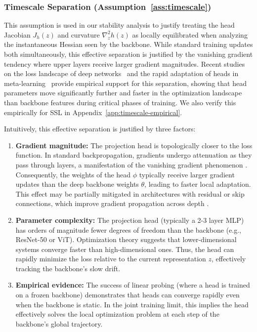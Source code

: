 \documentclass{article}
\theoremstyle{plain}
\theoremstyle{definition}
\theoremstyle{remark}
\begin{document}
\subsubsection{Timescale Separation (Assumption~\ref{ass:timescale})}
\label{app:timescale}

This assumption is used in our stability analysis to justify treating the head Jacobian $J_h(z)$ and curvature $\nabla^2_z h(z)$ as locally equilibrated when analyzing the instantaneous Hessian seen by the backbone. While standard training updates both simultaneously, this effective separation is justified by the vanishing gradient tendency where upper layers receive larger gradient magnitudes. Recent studies on the loss landscape of deep networks~\citep{fort2020deeplearningversuskernel} and the rapid adaptation of heads in meta-learning~\citep{raghu2020rapid} provide empirical support for this separation, showing that head parameters move significantly further and faster in the optimization landscape than backbone features during critical phases of training. We also verify this empirically for SSL in Appendix~\ref{app:timescale-empirical}.

Intuitively, this effective separation is justified by three factors:
\begin{enumerate}
    \item \textbf{Gradient magnitude:} The projection head is topologically closer to the loss function. In standard backpropagation, gradients undergo attenuation as they pass through layers, a manifestation of the vanishing gradient phenomenon \citep{bengio1994}. Consequently, the weights of the head $\phi$ typically receive larger gradient updates than the deep backbone weights $\theta$, leading to faster local adaptation. This effect may be partially mitigated in architectures with residual or skip connections, which improve gradient propagation across depth \citep{he2016identitymappingsdeepresidual}.
    \item \textbf{Parameter complexity:} The projection head (typically a 2-3 layer MLP) has orders of magnitude fewer degrees of freedom than the backbone (e.g., ResNet-50 or ViT). Optimization theory suggests that lower-dimensional systems converge faster than high-dimensional ones. Thus, the head can rapidly minimize the loss relative to the current representation $z$, effectively tracking the backbone's slow drift.
    \item \textbf{Empirical evidence:} The success of linear probing (where a head is trained on a frozen backbone) demonstrates that heads can converge rapidly even when the backbone is static. In the joint training limit, this implies the head effectively solves the local optimization problem at each step of the backbone's global trajectory.
\end{enumerate}
\end{document}
